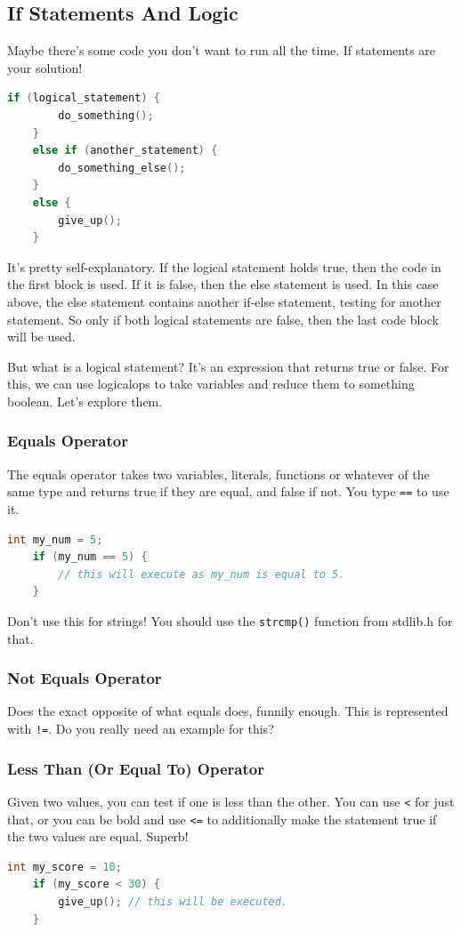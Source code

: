 \subsection{If Statements And Logic}
Maybe there's some code you don't want to run all the time. If statements are your solution!
\begin{lstlisting}[language=C]
    if (logical_statement) {
        do_something();
    }
    else if (another_statement) {
        do_something_else();
    }
    else {
        give_up();
    }
\end{lstlisting}

It's pretty self-explanatory. If the logical statement holds true, then the code in the first block is used. If it is false, then the else statement is used. In this case above, the else statement contains another if-else statement, testing for another statement. So only if both logical statements are false, then the last code block will be used.

But what is a logical statement? It's an expression that returns true or false. For this, we can use \glspl{logicalop} to take variables and reduce them to something boolean. Let's explore them.

\subsubsection{Equals Operator}
The equals operator takes two variables, literals, functions or whatever of the same type and returns true if they are equal, and false if not. You type \texttt{==} to use it.
\begin{lstlisting}[language=C]
    int my_num = 5;
    if (my_num == 5) {
        // this will execute as my_num is equal to 5.
    }
\end{lstlisting}

Don't use this for strings! You should use the \texttt{strcmp()} function from stdlib.h for that.

\subsubsection{Not Equals Operator}
Does the exact opposite of what equals does, funnily enough. This is represented with \texttt{!=}. Do you really need an example for this?

\subsubsection{Less Than (Or Equal To) Operator}
Given two values, you can test if one is less than the other. You can use \texttt{<} for just that, or you can be bold and use \texttt{<=} to additionally make the statement true if the two values are equal. Superb!
\begin{lstlisting}[language=C]
    int my_score = 10;
    if (my_score < 30) {
        give_up(); // this will be executed.
    }
\end{lstlisting}

